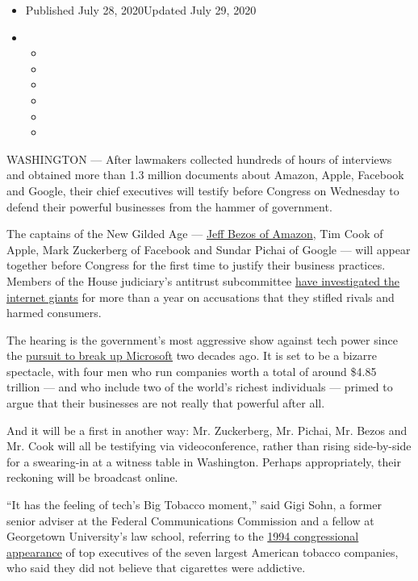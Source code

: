 \begin{itemize}
\item
  Published July 28, 2020Updated July 29, 2020
\item
  \begin{itemize}
  \item
  \item
  \item
  \item
  \item
  \item
  \end{itemize}
\end{itemize}

WASHINGTON --- After lawmakers collected hundreds of hours of interviews
and obtained more than 1.3 million documents about Amazon, Apple,
Facebook and Google, their chief executives will testify before Congress
on Wednesday to defend their powerful businesses from the hammer of
government.

The captains of the New Gilded Age ---
\href{https://www.nytimes.com/2020/07/27/business/jeff-bezos-amazon-congress.html}{Jeff
Bezos of Amazon}, Tim Cook of Apple, Mark Zuckerberg of Facebook and
Sundar Pichai of Google --- will appear together before Congress for the
first time to justify their business practices. Members of the House
judiciary's antitrust subcommittee
\href{https://www.nytimes.com/2019/06/11/technology/antitrust-hearing.html}{have
investigated the internet giants} for more than a year on accusations
that they stifled rivals and harmed consumers.

The hearing is the government's most aggressive show against tech power
since the
\href{https://www.nytimes.com/2000/04/04/business/us-vs-microsoft-overview-us-judge-says-microsoft-violated-antitrust-laws-with.html}{pursuit
to break up Microsoft} two decades ago. It is set to be a bizarre
spectacle, with four men who run companies worth a total of around
\$4.85 trillion --- and who include two of the world's richest
individuals --- primed to argue that their businesses are not really
that powerful after all.

And it will be a first in another way: Mr. Zuckerberg, Mr. Pichai, Mr.
Bezos and Mr. Cook will all be testifying via videoconference, rather
than rising side-by-side for a swearing-in at a witness table in
Washington. Perhaps appropriately, their reckoning will be broadcast
online.

``It has the feeling of tech's Big Tobacco moment,'' said Gigi Sohn, a
former senior adviser at the Federal Communications Commission and a
fellow at Georgetown University's law school, referring to the
\href{https://www.nytimes.com/1994/04/15/us/tobacco-chiefs-say-cigarettes-aren-t-addictive.html}{1994
congressional appearance} of top executives of the seven largest
American tobacco companies, who said they did not believe that
cigarettes were addictive.

